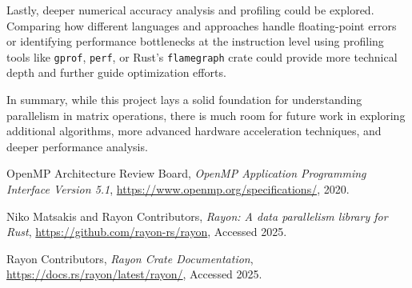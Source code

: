 \documentclass[12pt]{article}
\begin{document}
\vspace{1em}

Lastly, deeper numerical accuracy analysis and profiling could be explored. Comparing how different languages and approaches handle
floating-point errors or identifying performance bottlenecks at the instruction level using profiling tools like \texttt{gprof}, \texttt{perf}, or
Rust's \texttt{flamegraph} crate could provide more technical depth and further guide optimization efforts.

\vspace{1em}

In summary, while this project lays a solid foundation for understanding parallelism in matrix operations, there is much room for future work in exploring
additional algorithms, more advanced hardware acceleration techniques, and deeper performance analysis.


\newpage
\begin{thebibliography}{9}
    OpenMP Architecture Review Board, \textit{OpenMP Application Programming Interface Version 5.1},
    \url{https://www.openmp.org/specifications/}, 2020.

    Niko Matsakis and Rayon Contributors, \textit{Rayon: A data parallelism library for Rust},
    \url{https://github.com/rayon-rs/rayon}, Accessed 2025.

    Rayon Contributors, \textit{Rayon Crate Documentation}, \url{https://docs.rs/rayon/latest/rayon/}, Accessed 2025.
\end{thebibliography}
\end{document}
